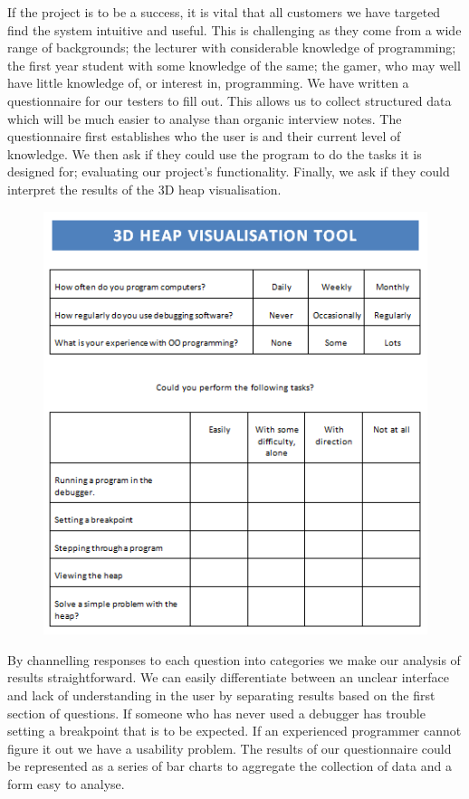 \documentclass[10pt, a4paper]{article}
\begin{document}
If the project is to be a success, it is vital that all customers we have targeted find the system intuitive and useful. This is challenging as they come from a wide range of backgrounds; the lecturer with considerable knowledge of programming; the first year student with some knowledge of the same; the gamer, who may well have little knowledge of, or interest in, programming. We have written a questionnaire for our testers to fill out. This allows us to collect structured data which will be much easier to analyse than organic interview notes. The questionnaire first establishes who the user is and their current level of knowledge. We then ask if they could use the program to do the tasks it is designed for; evaluating our project’s functionality. Finally, we ask if they could interpret the results of the 3D heap visualisation.

\begin{figure}[h]
        \centering
        \includegraphics[width=25{\%}]{images/questionnaire.png}
\end{figure}

By channelling responses to each question into categories we make our analysis of results straightforward. We can easily differentiate between an unclear interface and lack of understanding in the user by separating results based on the first section of questions. If someone who has never used a debugger has trouble setting a breakpoint that is to be expected. If an experienced programmer cannot figure it out we have a usability problem. The results of our questionnaire could be represented as a series of bar charts to aggregate the collection of data and a form easy to analyse. 
\end{document}
